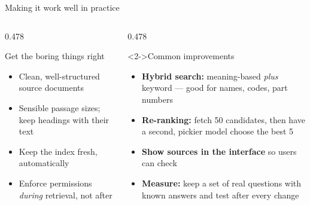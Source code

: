 \documentclass[aspectratio=169,11pt]{beamer}
\begin{document}
\begin{frame}{Making it work well in practice}
  \begin{columns}[T,onlytextwidth]
    \begin{column}{0.478\textwidth}
      \begin{block}{Get the boring things right}
        \begin{itemize}
          \item Clean, well-structured source documents
          \item Sensible passage sizes; keep headings with their text
          \item Keep the index fresh, automatically
          \item Enforce permissions \emph{during} retrieval, not after
        \end{itemize}
      \end{block}
    \end{column}
    \begin{column}{0.478\textwidth}
      \begin{block}<2->{Common improvements}
        \begin{itemize}[<+(1)->]
          \item \textbf{Hybrid search:} meaning-based \emph{plus} keyword ---
                good for names, codes, part numbers
          \item \textbf{Re-ranking:} fetch 50 candidates, then have a second,
                pickier model choose the best 5
          \item \textbf{Show sources in the interface} so users can check
          \item \textbf{Measure:} keep a set of real questions with known
                answers and test after every change
        \end{itemize}
      \end{block}
    \end{column}
  \end{columns}
\end{frame}
\end{document}
